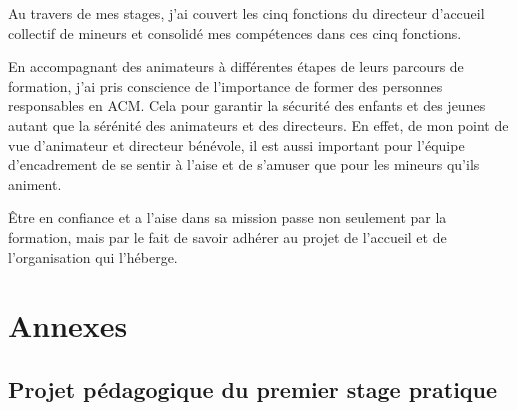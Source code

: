 \documentclass[titlepage,11pt,a4paper]{article}
\begin{document}
Au travers de mes stages, j'ai couvert les cinq fonctions du directeur d'accueil
collectif de mineurs et consolidé mes compétences dans ces cinq fonctions.

En accompagnant des animateurs à différentes étapes de leurs parcours de formation, j'ai
pris conscience de l'importance de former des personnes
responsables en ACM\@. Cela pour garantir la sécurité des enfants et des jeunes autant que
la sérénité des animateurs et des directeurs. En effet, de mon point de vue d'animateur et
directeur bénévole, il est aussi important pour l'équipe d'encadrement de se sentir à
l'aise et de s'amuser que pour les mineurs qu'ils animent.

Être en confiance et a l'aise dans sa mission passe non seulement par la formation, mais
par le fait de savoir adhérer au projet de l'accueil et de l'organisation qui l'héberge.

\newpage
\section{Annexes}

\subsection{Projet pédagogique du premier stage pratique}
\end{document}
